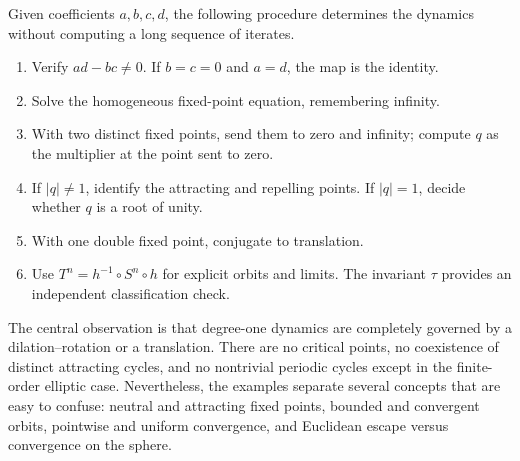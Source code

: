 \documentclass[11pt,a4paper]{article}
\newcommand{\abs}[1]{\left|#1\right|}
\theoremstyle{plain}
\theoremstyle{definition}
\theoremstyle{remark}
\begin{document}
Given coefficients $a,b,c,d$, the following procedure determines the
dynamics without computing a long sequence of iterates.
\begin{enumerate}
  \item Verify $ad-bc\ne0$. If $b=c=0$ and $a=d$, the map is the identity.
  \item Solve the homogeneous fixed-point equation, remembering infinity.
  \item With two distinct fixed points, send them to zero and infinity;
    compute $q$ as the multiplier at the point sent to zero.
  \item If $\abs{q}\ne1$, identify the attracting and repelling points.
    If $\abs{q}=1$, decide whether $q$ is a root of unity.
  \item With one double fixed point, conjugate to translation.
  \item Use $T^n=h^{-1}\circ S^n\circ h$ for explicit orbits and limits.
    The invariant $\tau$ provides an independent classification check.
\end{enumerate}

The central observation is that degree-one dynamics are completely governed
by a dilation--rotation or a translation. There are no critical points,
no coexistence of distinct attracting cycles, and no nontrivial periodic
cycles except in the finite-order elliptic case. Nevertheless, the examples
separate several concepts that are easy to confuse: neutral and attracting
fixed points, bounded and convergent orbits, pointwise and uniform
convergence, and Euclidean escape versus convergence on the sphere.
\end{document}
